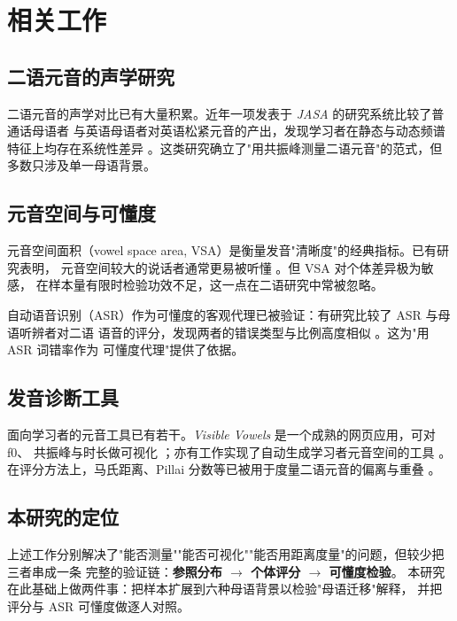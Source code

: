 \documentclass[11pt,a4paper]{ctexart}
\begin{document}
\section{相关工作}

\subsection{二语元音的声学研究}

二语元音的声学对比已有大量积累。近年一项发表于 \textit{JASA} 的研究系统比较了普通话母语者
与英语母语者对英语松紧元音的产出，发现学习者在静态与动态频谱特征上均存在系统性差异
\cite{jasa2024}。这类研究确立了"用共振峰测量二语元音"的范式，但多数只涉及单一母语背景。

\subsection{元音空间与可懂度}

元音空间面积（vowel space area, VSA）是衡量发音"清晰度"的经典指标。已有研究表明，
元音空间较大的说话者通常更易被听懂 \cite{bradlow1996}。但 VSA 对个体差异极为敏感，
在样本量有限时检验功效不足，这一点在二语研究中常被忽略。

自动语音识别（ASR）作为可懂度的客观代理已被验证：有研究比较了 ASR 与母语听辨者对二语
语音的评分，发现两者的错误类型与比例高度相似 \cite{recall}。这为"用 ASR 词错率作为
可懂度代理"提供了依据。

\subsection{发音诊断工具}

面向学习者的元音工具已有若干。\textit{Visible Vowels} 是一个成熟的网页应用，可对 f0、
共振峰与时长做可视化 \cite{visiblevowels}；亦有工作实现了自动生成学习者元音空间的工具
\cite{vowspace}。在评分方法上，马氏距离、Pillai 分数等已被用于度量二语元音的偏离与重叠
\cite{icphs2023}。

\subsection{本研究的定位}

上述工作分别解决了"能否测量""能否可视化""能否用距离度量"的问题，但较少把三者串成一条
完整的验证链：\textbf{参照分布 $\rightarrow$ 个体评分 $\rightarrow$ 可懂度检验}。
本研究在此基础上做两件事：把样本扩展到六种母语背景以检验"母语迁移"解释，
并把评分与 ASR 可懂度做逐人对照。
\end{document}
